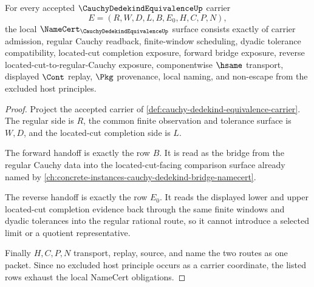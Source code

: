 \begin{theorem}
\label{thm:cauchy-dedekind-equivalence-namecert-obligations}
For every accepted $\CauchyDedekindEquivalenceUp$ carrier
$$
E=(R,W,D,L,B,E_{0},H,C,P,N),
$$
the local $\NameCert_{\CauchyDedekindEquivalenceUp}$ surface consists exactly of carrier admission, regular Cauchy readback, finite-window scheduling, dyadic tolerance compatibility, located-cut completion exposure, forward bridge exposure, reverse located-cut-to-regular-Cauchy exposure, componentwise $\hsame$ transport, displayed $\Cont$ replay, $\Pkg$ provenance, local naming, and non-escape from the excluded host principles.
\end{theorem}
\begin{proof}
Project the accepted carrier of \autoref{def:cauchy-dedekind-equivalence-carrier}. The regular side is $R$, the common finite observation and tolerance surface is $W,D$, and the located-cut completion side is $L$.

The forward handoff is exactly the row $B$. It is read as the bridge from the regular Cauchy data into the located-cut-facing comparison surface already named by \autoref{ch:concrete-instances-cauchy-dedekind-bridge-namecert}.

The reverse handoff is exactly the row $E_{0}$. It reads the displayed lower and upper located-cut completion evidence back through the same finite windows and dyadic tolerances into the regular rational route, so it cannot introduce a selected limit or a quotient representative.

Finally $H,C,P,N$ transport, replay, source, and name the two routes as one packet. Since no excluded host principle occurs as a carrier coordinate, the listed rows exhaust the local NameCert obligations.
\end{proof}

